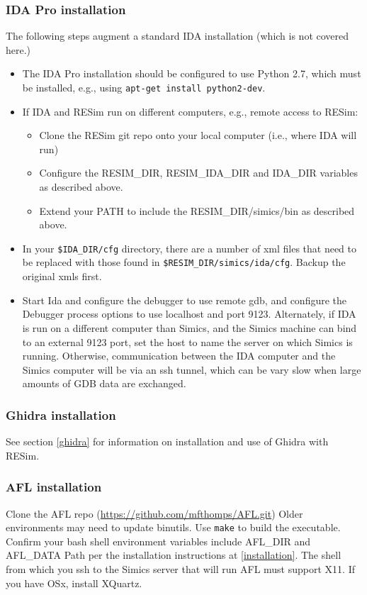 \documentclass[titlepage]{article}
\begin{document}
\subsubsection{IDA Pro installation}
\label{ida-install}
The following steps augment a standard IDA installation (which is not covered here.)
\begin{itemize}
\item The IDA Pro installation should be configured to use Python 2.7, which must be
installed, e.g., using {\tt apt-get install python2-dev}. 
\item If IDA and RESim run on different computers, e.g., remote access to RESim: 
\begin{itemize}
\item Clone the RESim git repo onto your local computer (i.e., where IDA will run)
\item Configure the RESIM\_DIR, RESIM\_IDA\_DIR and
IDA\_DIR variables as described above.  
\item Extend your PATH to include the RESIM\_DIR/simics/bin as described above.
\end{itemize}

\item In your {\tt \$IDA\_DIR/cfg} directory, there are a number of xml files that need to be replaced with those found
in {\tt \$RESIM\_DIR/simics/ida/cfg}.  Backup the original xmls first.

\item Start Ida and configure the debugger to use remote gdb, and configure the Debugger process options to use localhost and port 9123.  Alternately,
if IDA is run on a different computer than Simics, and the Simics machine can bind to an external 9123 port, set the host to name the server
on which Simics is running.  Otherwise, communication between the IDA computer and the Simics computer will be via an ssh tunnel, which can be vary slow
when large amounts of GDB data are exchanged.

\end{itemize}
\subsubsection{Ghidra installation}
See section \ref{ghidra} for information on installation and use of Ghidra with RESim.

\subsubsection{AFL installation}
Clone the AFL repo (\url{https://github.com/mfthomps/AFL.git})   Older environments may need to update binutils. Use {\tt make} to build the executable.
Confirm your bash shell environment variables include AFL\_DIR and AFL\_DATA Path per the installation instructions at \ref{installation}.
The shell from which you ssh to the Simics server that will run AFL must support X11.  If you have OSx, install XQuartz.
\end{document}
